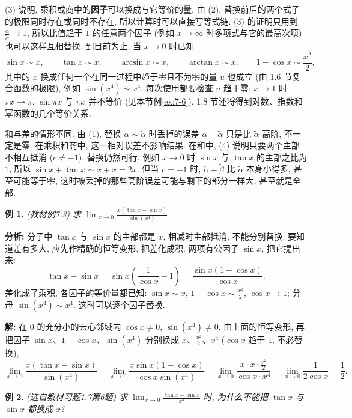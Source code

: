 \documentclass[UTF8,openany]{ctexbook}
\theoremstyle{chinesetextbook}
\newtheorem{example}{例}[section]
\newenvironment{cnsolution}{\par\indent\textbf{解:} \ignorespaces}{\par}
\begin{document}
(3) 说明, 乘积或商中的\textbf{因子}可以换成与它等价的量. 由 (2), 替换前后的两个式子的极限同时存在或同时不存在, 所以计算时可以直接写等式链. (3) 的证明只用到 $\displaystyle\frac\alpha{\widetilde\alpha}\to1$, 所以比值趋于 $1$ 的任意两个因子 (例如 $x\to\infty$ 时多项式与它的最高次项) 也可以这样互相替换. 到目前为止, 当 $x\to0$ 时已知
\[
\sin x\sim x,\qquad\tan x\sim x,\qquad\arcsin x\sim x,\qquad\arctan x\sim x,\qquad1-\cos x\sim\frac{x^2}2,
\]
其中的 $x$ 换成任何一个在同一过程中趋于零且不为零的量 $u$ 也成立 (由 1.6 节复合函数的极限), 例如 $\sin(x^4)\sim x^4$. 每次使用都要检查 $u$ 趋于零: $x\to1$ 时 $\pi x\to\pi$, $\sin\pi x$ 与 $\pi x$ 并不等价 (见本节例\ref{ex:7-6}). 1.8 节还将得到对数、指数和幂函数的几个等价关系.

和与差的情形不同. 由 (1), 替换 $\alpha\sim\widetilde\alpha$ 时丢掉的误差 $\alpha-\widetilde\alpha$ 只是比 $\widetilde\alpha$ 高阶, 不一定是零. 在乘积和商中, 这一相对误差不影响结果. 在和中, (4) 说明只要两个主部不相互抵消 ($c\ne-1$), 替换仍然可行. 例如 $x\to0$ 时 $\sin x$ 与 $\tan x$ 的主部之比为 $1$, 所以 $\sin x+\tan x\sim x+x=2x$. 但当 $c=-1$ 时, $\widetilde\alpha+\widetilde\beta$ 比 $\widetilde\alpha$ 本身小得多, 甚至可能等于零, 这时被丢掉的那些高阶误差可能与剩下的部分一样大, 甚至就是全部.
\begin{example}\label{ex:7-3}
\textnormal{(教材例7.3)} 求 $\displaystyle\lim_{x\to0}\frac{x(\tan x-\sin x)}{\sin(x^4)}$.
\end{example}
\par\indent\textbf{分析:} 分子中 $\tan x$ 与 $\sin x$ 的主部都是 $x$, 相减时主部抵消, 不能分别替换. 要知道差有多大, 应先作精确的恒等变形, 把差化成积. 两项有公因子 $\sin x$, 把它提出来:
\[
\tan x-\sin x=\sin x\left(\frac1{\cos x}-1\right)=\frac{\sin x(1-\cos x)}{\cos x}.
\]
差化成了乘积, 各因子的等价量都已知: $\sin x\sim x$, $\displaystyle1-\cos x\sim\frac{x^2}2$, $\cos x\to1$; 分母 $\sin(x^4)\sim x^4$. 这时可以逐个因子替换.
\begin{cnsolution}
在 $0$ 的充分小的去心邻域内 $\cos x\ne0$, $\sin(x^4)\ne0$. 由上面的恒等变形, 再把因子 $\sin x$、$1-\cos x$、$\sin(x^4)$ 分别换成 $x$、$\displaystyle\frac{x^2}2$、$x^4$ ($\cos x$ 趋于 $1$, 不必替换),
\[
\lim_{x\to0}\frac{x(\tan x-\sin x)}{\sin(x^4)}=\lim_{x\to0}\frac{x\sin x(1-\cos x)}{\cos x\sin(x^4)}=\lim_{x\to0}\frac{x\cdot x\cdot\frac{x^2}2}{\cos x\cdot x^4}=\lim_{x\to0}\frac1{2\cos x}=\frac12.
\]
\end{cnsolution}
\begin{example}
\textnormal{(选自教材习题1.7第6题)} 求 $\displaystyle\lim_{x\to0}\frac{\tan x-\sin x}{x^3}$ 时, 为什么不能把 $\tan x$ 与 $\sin x$ 都换成 $x$?
\end{example}
\end{document}
